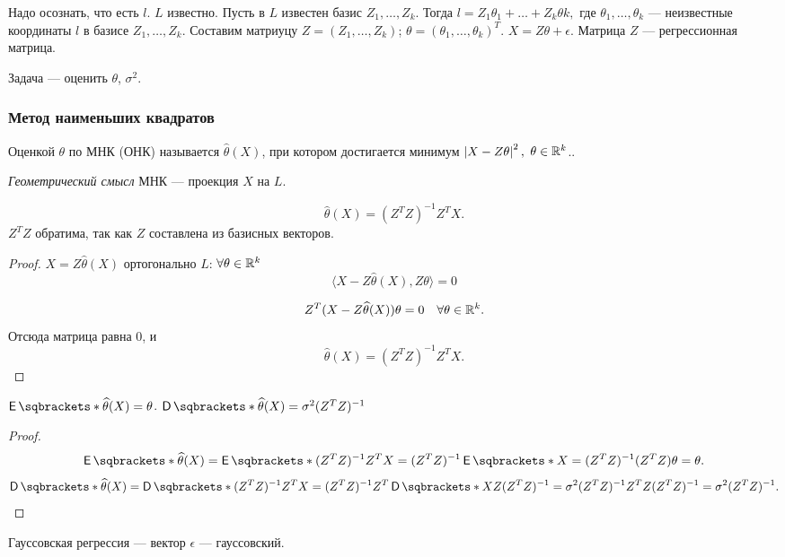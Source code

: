 Надо осознать, что есть \(l\). \(L\) известно. Пусть в \(L\) известен базис \(Z_1, \ldots, Z_k\). Тогда \(l = Z_1 \theta_1 + \ldots + Z_k \theta k,\) где \(\theta_1, \ldots, \theta_k\) --- неизвестные координаты \(l\) в базисе \(Z_1, \ldots, Z_k\).
Составим матриуцу \(Z = (Z_1, \ldots, Z_k)\); \(\theta = (\theta_1, \ldots, \theta_k)^T\). \(X = Z \theta + \epsilon\). Матрица \(Z\) --- регрессионная матрица.

Задача --- оценить \(\theta\), \(\sigma^2\).

\subsubsection{Метод наименьших квадратов}
\begin{definition}
    Оценкой \(\theta\) по МНК (ОНК) называется \(\widehat\theta(X)\), при котором достигается минимум \(\left|X - Z \theta\right|^2,\) \(\theta \in \mathbb{R}^k\)..
\end{definition}

\textit{Геометрический смысл} МНК --- проекция \(X\) на \(L\).

\begin{remark}
    \begin{displaymath}
        \widehat\theta(X) = (Z^T Z)^{-1} Z^T X.
    \end{displaymath}
    \(Z^T Z\) обратима, так как \(Z\) составлена из базисных векторов.
\end{remark}
\begin{proof}
    \(X = Z \widehat\theta(X)\) ортогонально \(L\): \(\forall \theta \in \mathbb{R}^k\)
    \begin{displaymath}
        \langle X - Z\widehat \theta(X), Z \theta\rangle = 0
    \end{displaymath}

    \begin{displaymath}
        Z^T (X - Z \widehat\theta (X)) \theta = 0 \quad \forall \theta \in \mathbb{R}^k.
    \end{displaymath}
    Отсюда матрица равна 0, и 
    \begin{displaymath}
        \widehat\theta(X) = (Z^T Z)^{-1} Z^T X.
    \end{displaymath}
\end{proof}

\begin{remark}
    \(\E{\widehat\theta(X)} = \theta\).
    \(\D{\widehat\theta(X)} = \sigma^2 (Z^T Z)^{-1}\)
\end{remark}
\begin{proof}
    \begin{displaymath}
        \E{\widehat\theta(X)} = \E{(Z^T Z)^{-1} Z^T X} = (Z^T Z)^{-1} \E{X} = (Z^T Z)^{-1} (Z^T Z) \theta = \theta.
    \end{displaymath}
    \begin{displaymath}
        \D{\widehat\theta(X)} = \D{(Z^T Z)^{-1} Z^T X} = (Z^T Z)^{-1} Z^T \D{X} Z(Z^T Z)^{-1} = \sigma^2 (Z^T Z)^{-1} Z^T Z (Z^T Z)^{-1} = \sigma^2 (Z^T Z)^{-1}.
    \end{displaymath}
\end{proof}

Гауссовская регрессия --- вектор \(\epsilon\) --- гауссовский.
